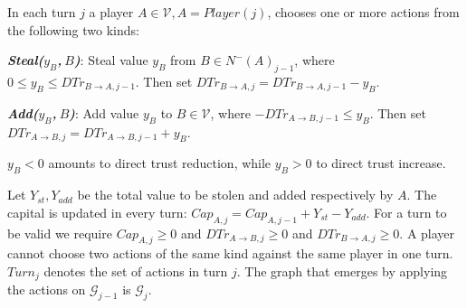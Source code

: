 \begin{definition}[Turns]
  In each turn $j$ a player $A \in \mathcal{V}, A = Player\left(j\right)$, chooses one or more actions from the following two
  kinds:

  \noindent \textit{\textbf{Steal($y_B$,$\:B$)}}: Steal value $y_B$ from $B \in N^{-}\left(A\right)_{j-1}$, where
  $0 \leq y_B \leq DTr_{B \rightarrow A, j-1}$. Then set $DTr_{B \rightarrow A, j} = DTr_{B \rightarrow A, j-1} - y_B$.

  \noindent \textit{\textbf{Add($y_B$,$\:B$)}}: Add value $y_B$ to $B \in \mathcal{V}$, where
  $-DTr_{A \rightarrow B, j-1} \leq y_B$. Then set $DTr_{A \rightarrow B, j} = DTr_{A \rightarrow B, j-1} + y_B$.

  $y_B < 0$ amounts to direct trust reduction, while $y_B > 0$ to direct trust increase.

  Let $Y_{st}, Y_{add}$ be the total value to be stolen and added respectively by $A$.  The capital is updated in every turn:
  $Cap_{A, j} = Cap_{A, j-1} + Y_{st} - Y_{add}$. For a turn to be valid we require $Cap_{A, j} \geq 0$ and $DTr_{A
  \rightarrow B, j} \geq 0$ and $DTr_{B \rightarrow A, j} \geq 0$. A player cannot choose two actions of the same kind against
  the same player in one turn. $Turn_j$ denotes the set of actions in turn $j$. The graph that emerges by applying the actions
  on $\mathcal{G}_{j-1}$ is $\mathcal{G}_j$.
\end{definition}
